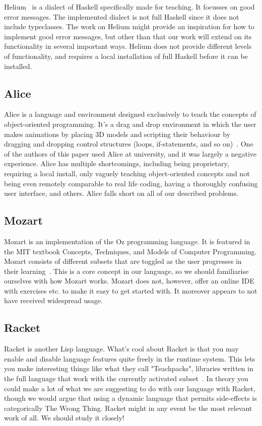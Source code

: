 Helium~\cite{DBLP:conf/haskell/HeerenLI03} is a dialect of Haskell specifically
made for teaching. It focusses on good error messages. The implemented dialect
is not full Haskell since it does not include typeclasses. The work on Helium
might provide an inspiration for how to implement good error messages, but other
than that our work will extend on its functionality in several important ways.
Helium does not provide different levels of functionality, and requires a local
installation of full Haskell before it can be installed.

\subsection{Alice}
Alice is a language and environment designed exclusively to teach the concepts 
of object-oriented programming. It's a drag and drop environment in which the 
user makes animations by placing 3D models and scripting their behaviour by 
dragging and dropping control structures (loops, if-statements, and so 
on)~\cite{alice2015whatisalice}. One of the authors of this paper used Alice 
at university, and it was largely a negative experience. Alice has multiple 
shortcomings, including being proprietary, requiring a local install, only 
vaguely teaching object-oriented concepts and not being even remotely 
comparable to real life coding, having a thoroughly confusing user interface, 
and others. Alice falls short on all of our described problems.

\subsection{Mozart}
Mozart is an implementation of the Oz programming language. It is featured in 
the MIT textbook Concepts, Techniques, and Models of Computer Programming. 
Mozart consists of different subsets that are toggled as the user progresses 
in their learning~\cite{van2004concepts}. This is a core concept in our 
language, so we should familiarise ourselves with how Mozart works. Mozart 
does not, however, offer an online IDE with exercises etc. to make it easy to 
get started with. It moreover appears to not have received widespread usage.

\subsection{Racket}
Racket is another Lisp language. What's cool about Racket is that you may 
enable and disable language features quite freely in the runtime system. This 
lets you make interesting things like what they call "Teachpacks", libraries 
written in the full language that work with the currently activated 
subset~\cite{flatt2015racket}. In theory you could make a lot of what we are 
suggesting to do with our language with Racket, though we would argue that 
using a dynamic language that permits side-effects is categorically The Wrong 
Thing. Racket might in any event be the most relevant work of all. We should 
study it closely!

